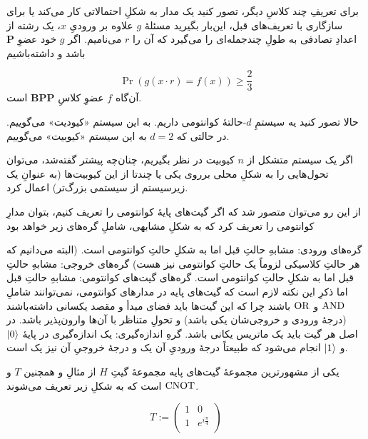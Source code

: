 برای تعریفِ چند کلاسِ دیگر، تصور کنید یک مدار به شکلِ احتمالاتی کار می‌کند یا برای سازگاری با تعریف‌های قبل، این‌بار بگیرید مسئلهٔ \(g\) علاوه بر ورودیِ \(x\)، یک رشته از اعدادِ تصادفی به طولِ چندجمله‌ای را می‌گیرد که آن را \(r\) می‌نامیم. اگر \(g\) خود عضوِ 
\( \mathbf{P} \) 
باشد و داشته‌باشیم

\begin{equation}
    \Pr(g(x \cdot r) = f(x)) \ge \frac{2}{3}
\end{equation} 
آن‌گاه \(f\) عضوِ کلاسِ 
\( \mathbf{BPP} \)
است. 
 
 
حالا تصور کنید یه سیستمِ \(d\)-حالتهٔ 
کوانتومی داریم. به این سیستم «کیودیت» می‌گوییم. در حالتی که 
\(d=2\)
به این سیستم «کیوبیت» می‌گوییم.

اگر یک سیستم متشکل از \(n\) کیوبیت در نظر بگیریم، چنان‌چه پیشتر گفته‌شد، می‌توان تحول‌هایی را به شکلِ محلی برروی یکی یا چندتا از این کیوبیت‌ها (به عنوانِ یک زیرسیستم از سیستمی بزرگ‌تر) اعمال کرد.

از این رو می‌توان متصور شد که اگر گیت‌های پایهٔ کوانتومی را تعریف کنیم، بتوان مدارِ کوانتومی را تعریف کرد که به شکلِ مشابهی، شاملِ گره‌های زیر خواهد بود 

 گره‌های ورودی: مشابهِ حالتِ قبل اما به شکلِ حالتِ کوانتومی است. (البته می‌دانیم که هر حالتِ کلاسیکی لزوماً یک حالتِ کوانتومی نیز هست)
 گره‌های خروجی: مشابهِ حالتِ قبل اما به شکلِ حالتِ کوانتومی است.
 گره‌های گیت‌های کوانتومی: مشابهِ حالتِ قبل اما ذکرِ این نکته لازم است که گیت‌های پایه در مدارهای کوانتومی، نمی‌توانند شاملِ
\(\operatorname{AND}\)
و
\(\operatorname{OR}\)
باشند چرا که این گیت‌ها باید فضای مبدأ و مقصد یکسانی داشته‌باشند (درجهٔ ورودی و خروجی‌شان یکی باشد) و تحولِ متناظر با آن‌ها وارون‌پذیر باشد. در اصل هر گیت باید یک ماتریس یکانی باشد.
 گرهِ اندازه‌گیری: یک اندازه‌گیری در پایهٔ 
\( \ket{0} \)
و 
\( \ket{1} \)
انجام می‌شود که طبیعتاً درجهٔ ورودیِ آن یک و درجهٔ خروجیِ آن نیز یک است.


یکی از مشهورترین مجموعهٔ گیت‌های پایه مجموعهٔ گیتِ \(H\) از مثالِ  و همچنین \(T\) و \(\operatorname{CNOT}\)
است که به شکلِ زیر تعریف می‌شوند. 

\begin{equation}
    T := \begin{pmatrix}
        1 & 0 \\
        1 & e^{i\frac{\pi}{4}} \\
    \end{pmatrix}
\end{equation}

